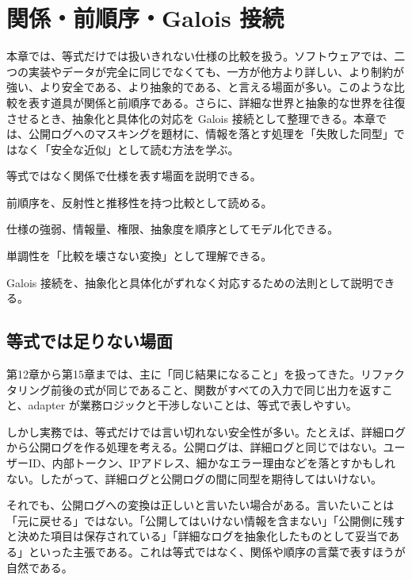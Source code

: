 \chapter{関係・前順序・Galois 接続}
\label{chap:relations-preorders-galois}

\begin{chapterabstract}
本章では、等式だけでは扱いきれない仕様の比較を扱う。ソフトウェアでは、二つの実装やデータが完全に同じでなくても、一方が他方より詳しい、より制約が強い、より安全である、より抽象的である、と言える場面が多い。このような比較を表す道具が関係と前順序である。さらに、詳細な世界と抽象的な世界を往復させるとき、抽象化と具体化の対応を Galois 接続として整理できる。本章では、公開ログへのマスキングを題材に、情報を落とす処理を「失敗した同型」ではなく「安全な近似」として読む方法を学ぶ。
\end{chapterabstract}

\begin{learninggoals}
\item 等式ではなく関係で仕様を表す場面を説明できる。
\item 前順序を、反射性と推移性を持つ比較として読める。
\item 仕様の強弱、情報量、権限、抽象度を順序としてモデル化できる。
\item 単調性を「比較を壊さない変換」として理解できる。
\item Galois 接続を、抽象化と具体化がずれなく対応するための法則として説明できる。
\end{learninggoals}

\section{等式では足りない場面}

第12章から第15章までは、主に「同じ結果になること」を扱ってきた。リファクタリング前後の式が同じであること、関数がすべての入力で同じ出力を返すこと、adapter が業務ロジックと干渉しないことは、等式で表しやすい。

しかし実務では、等式だけでは言い切れない安全性が多い。たとえば、詳細ログから公開ログを作る処理を考える。公開ログは、詳細ログと同じではない。ユーザーID、内部トークン、IPアドレス、細かなエラー理由などを落とすかもしれない。したがって、詳細ログと公開ログの間に同型を期待してはいけない。

それでも、公開ログへの変換は正しいと言いたい場合がある。言いたいことは「元に戻せる」ではない。「公開してはいけない情報を含まない」「公開側に残すと決めた項目は保存されている」「詳細なログを抽象化したものとして妥当である」といった主張である。これは等式ではなく、関係や順序の言葉で表すほうが自然である。

